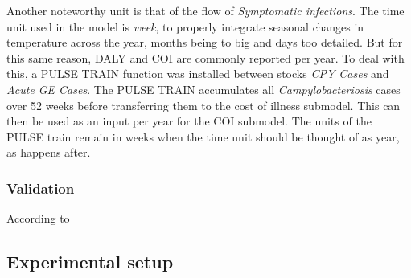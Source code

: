 Another noteworthy unit is that of the flow of \textit{Symptomatic infections}. The time unit used in the model is \textit{week}, to properly integrate seasonal changes in temperature across the year, months being to big and days too detailed. But for this same reason, DALY and COI are commonly reported per year. To deal with this, a PULSE TRAIN function was installed between stocks \textit{CPY Cases} and \textit{Acute GE Cases}. The PULSE TRAIN accumulates all \textit{Campylobacteriosis} cases over 52 weeks before transferring them to the cost of illness submodel. This can then be used as an input per year for the COI submodel. The units of the PULSE train remain in weeks when the time unit should be thought of as year, as happens after. 

    
\subsubsection{Validation}    

According to

    
\subsection{Experimental setup}

